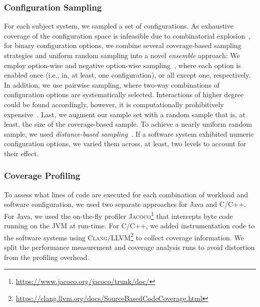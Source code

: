 {\subsubsection{Configuration Sampling}\label{sec:sampling}
For each subject system, we sampled a set of configurations. As exhaustive coverage of the configuration space is infeasible due to combinatorial explosion~\cite{henardCombining2015}, for binary configuration options, we combine several coverage-based sampling strategies and uniform random sampling into a novel \emph{ensemble} approach: 
We employ option-wise and negative option-wise sampling~\cite{siegmundPerformanceinfluenceModelsHighly2015}, where each option is enabled once (i.e., in, at least, one configuration), or all except one, respectively. In addition, we use pairwise sampling, where two-way combinations of configuration options are systematically selected. Interactions of higher degree could be found accordingly, however, it is computationally prohibitively expensive~\cite{henardCombining2015}. 
Last, we augment our sample set with a random sample that is, at least, the size of the coverage-based sample. To achieve a nearly uniform random sample, we used \emph{distance-based sampling}~\cite{kaltenecker_distance-based_2019}. If a software system exhibited numeric configuration options, we varied them across, at least, two levels to account for their effect. %


\subsubsection{Coverage Profiling}\label{sec:profiling}
{\color{edited}
To assess what lines of code are executed for each combination of workload and software configuration, we used two separate approaches for Java and C/C++. For Java, we used the on-the-fly profiler \textsc{Jacoco}\footnote{\url{https://www.jacoco.org/jacoco/trunk/doc/}} that intercepts byte code running on the JVM at run-time. For C/C++, we added instrumentation code to the software systems using \textsc{Clang/LLVM}\footnote{\url{https://clang.llvm.org/docs/SourceBasedCodeCoverage.html}} to collect coverage information. We split the performance measurement and coverage analysis runs to  avoid distortion from the profiling overhead.
}
	
}

